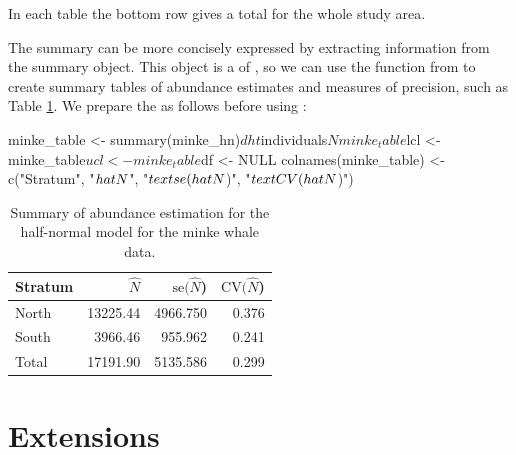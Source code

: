 \documentclass[article,shortnames]{jss}
\begin{document}
In each table the bottom row gives a total for the whole study area.

The summary can be more concisely expressed by extracting information
from the summary object. This object is a  of
, so we can use the  function from
 to create summary tables of abundance estimates and measures
of precision, such as Table \ref{minke-abund}. We prepare the
 as follows before using :

\begin{CodeChunk}
\begin{CodeInput}
minke_table <- summary(minke_hn)$dht$individuals$N
minke_table$lcl <- minke_table$ucl <- minke_table$df <- NULL
colnames(minke_table) <- c("Stratum", "$\\hat{N}$", "$\\text{se}(\\hat{N}$)", 
                           "$\\text{CV}(\\hat{N}$)")
\end{CodeInput}
\end{CodeChunk}

\begin{CodeChunk}
\begin{table}

\centering
\begin{tabular}[t]{lrrr}
\toprule
Stratum & $\hat{N}$ & $\text{se}(\hat{N}$) & $\text{CV}(\hat{N}$)\\
\midrule
North & 13225.44 & 4966.750 & 0.376\\
South & 3966.46 & 955.962 & 0.241\\
Total & 17191.90 & 5135.586 & 0.299\\
\bottomrule
\end{tabular}
\caption{Summary of abundance estimation for the half-normal model for the minke whale data.\label{minke-abund}}
\end{table}

\end{CodeChunk}

\section{Extensions}\label{extensions}
\end{document}
